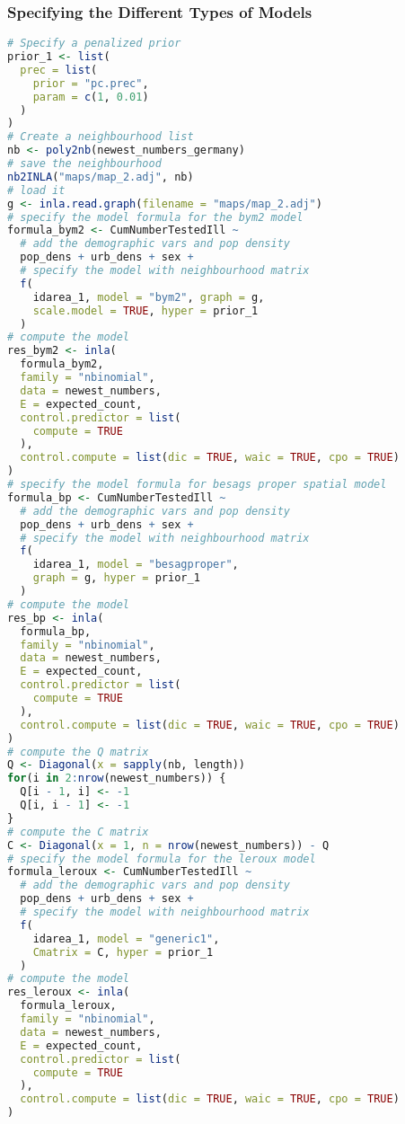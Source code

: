 \subsubsection{Specifying the Different Types of Models}
\begin{lstlisting}[caption={Specifying different models in INLA.}, label={codeModels}, language=R]
# Specify a penalized prior
prior_1 <- list(
  prec = list(
    prior = "pc.prec",
    param = c(1, 0.01)
  )
)
# Create a neighbourhood list
nb <- poly2nb(newest_numbers_germany)
# save the neighbourhood
nb2INLA("maps/map_2.adj", nb)
# load it
g <- inla.read.graph(filename = "maps/map_2.adj")
# specify the model formula for the bym2 model
formula_bym2 <- CumNumberTestedIll ~
  # add the demographic vars and pop density
  pop_dens + urb_dens + sex + 
  # specify the model with neighbourhood matrix
  f(
    idarea_1, model = "bym2", graph = g,
    scale.model = TRUE, hyper = prior_1
  )
# compute the model
res_bym2 <- inla(
  formula_bym2,
  family = "nbinomial",
  data = newest_numbers,
  E = expected_count,
  control.predictor = list(
    compute = TRUE
  ),
  control.compute = list(dic = TRUE, waic = TRUE, cpo = TRUE)
)
# specify the model formula for besags proper spatial model
formula_bp <- CumNumberTestedIll ~
  # add the demographic vars and pop density
  pop_dens + urb_dens + sex + 
  # specify the model with neighbourhood matrix
  f(
    idarea_1, model = "besagproper",
    graph = g, hyper = prior_1
  )
# compute the model
res_bp <- inla(
  formula_bp,
  family = "nbinomial",
  data = newest_numbers,
  E = expected_count,
  control.predictor = list(
    compute = TRUE
  ),
  control.compute = list(dic = TRUE, waic = TRUE, cpo = TRUE)
)
# compute the Q matrix
Q <- Diagonal(x = sapply(nb, length))
for(i in 2:nrow(newest_numbers)) {
  Q[i - 1, i] <- -1
  Q[i, i - 1] <- -1
}
# compute the C matrix
C <- Diagonal(x = 1, n = nrow(newest_numbers)) - Q
# specify the model formula for the leroux model
formula_leroux <- CumNumberTestedIll ~
  # add the demographic vars and pop density
  pop_dens + urb_dens + sex + 
  # specify the model with neighbourhood matrix
  f(
    idarea_1, model = "generic1",
    Cmatrix = C, hyper = prior_1
  )
# compute the model
res_leroux <- inla(
  formula_leroux,
  family = "nbinomial",
  data = newest_numbers,
  E = expected_count,
  control.predictor = list(
    compute = TRUE
  ),
  control.compute = list(dic = TRUE, waic = TRUE, cpo = TRUE)
)
\end{lstlisting}
